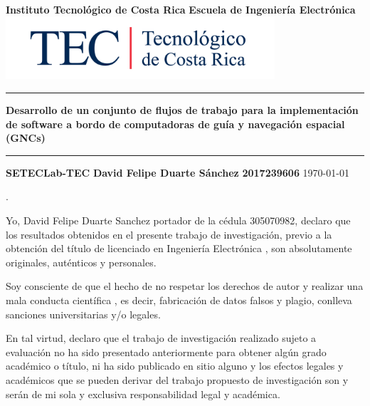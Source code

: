 \documentclass[12pt]{article}
\begin{document}
\begin{titlepage}

  \centering
  \vspace{10cm}
  \textbf{\LARGE Instituto Tecnológico de Costa Rica}
  \vspace{2cm}
  \textbf{\LARGE Escuela de Ingeniería Electrónica}
  \vspace{2cm}
  \includegraphics[width=10cm]{logotec/image.png}
  \vspace{2cm}
  \hrule
  \vspace{1cm}
  \textbf{\LARGE Desarrollo de un conjunto de flujos de trabajo para la implementación de software a bordo de computadoras de guía y navegación espacial (GNCs)}
  \vspace{1cm}
  \hrule
  \vspace{1cm}
  \textbf{\LARGE SETECLab-TEC}
  \vspace{1cm}
  \textbf{\LARGE David Felipe Duarte Sánchez}
  \vspace{1cm}
  \textbf{\LARGE 2017239606}
  \vspace{1cm}
  \today %
\end{titlepage}
.
\par
\vspace{16cm} %

Yo, David Felipe Duarte Sanchez portador de la cédula 305070982, declaro que los resultados obtenidos en el presente trabajo de investigación, previo a la obtención del título de licenciado en Ingeniería Electrónica , son absolutamente originales, auténticos y personales.

Soy consciente de que el hecho de no respetar los derechos de autor y realizar una mala conducta científica , es decir, fabricación de datos falsos y plagio, conlleva sanciones universitarias y/o legales.

En tal virtud, declaro que el trabajo de investigación realizado sujeto a evaluación no ha sido presentado anteriormente para obtener algún grado académico o título, ni ha sido publicado en sitio alguno y los efectos legales y académicos que se pueden derivar del trabajo propuesto de investigación son y serán de mi sola y exclusiva responsabilidad legal y académica.
\end{document}
